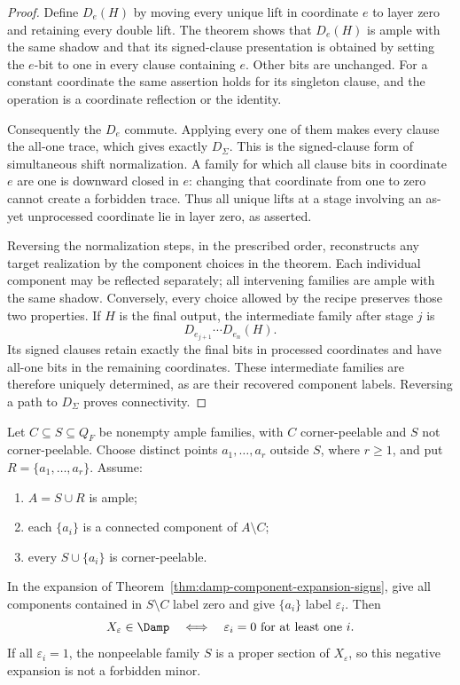 \begin{proof}
Define $D_e(H)$ by moving every unique lift in coordinate $e$ to layer
zero and retaining every double lift.  The theorem shows that $D_e(H)$
is ample with the same shadow and that its signed-clause presentation
is obtained by setting the $e$-bit to one in every clause containing $e$.
Other bits are unchanged.  For a constant coordinate the same assertion
holds for its singleton clause, and the operation is a coordinate
reflection or the identity.

Consequently the $D_e$ commute.  Applying every one of them makes every
clause the all-one trace, which gives exactly $D_\Sigma$.  This is the
signed-clause form of simultaneous shift normalization.  A family for
which all clause bits in coordinate $e$ are one is downward closed in
$e$: changing that coordinate from one to zero cannot create a forbidden
trace.  Thus all unique lifts at a stage involving an as-yet unprocessed
coordinate lie in layer zero, as asserted.

Reversing the normalization steps, in the prescribed order, reconstructs
any target realization by the component choices in the theorem.  Each
individual component may be reflected separately; all intervening families
are ample with the same shadow.  Conversely, every choice allowed by the
recipe preserves those two properties.  If $H$ is the final output,
the intermediate family after stage $j$ is
\[
 D_{e_{j+1}}\cdots D_{e_n}(H).
\]
Its signed clauses retain exactly the final bits in processed coordinates
and have all-one bits in the remaining coordinates.  These intermediate
families are therefore uniquely determined, as are their recovered
component labels.  Reversing a path to $D_\Sigma$ proves connectivity.
\end{proof}

\begin{proposition}
\label{prop:damp-component-label-repair-disjunction}
Let $C\subseteq S\subseteq Q_F$ be nonempty ample families, with $C$
corner-peelable and $S$ not corner-peelable.  Choose distinct points
$a_1,\ldots,a_r$ outside $S$, where $r\ge1$, and put
$R=\{a_1,\ldots,a_r\}$.  Assume:
\begin{enumerate}
 \item $A=S\cup R$ is ample;
 \item each $\{a_i\}$ is a connected component of $A\setminus C$;
 \item every $S\cup\{a_i\}$ is corner-peelable.
\end{enumerate}
In the expansion of Theorem~\ref{thm:damp-component-expansion-signs}, give
all components contained in $S\setminus C$ label zero and give
$\{a_i\}$ label $\varepsilon_i$.  Then
\[
 X_{\varepsilon}\in\Damp
 \quad\Longleftrightarrow\quad
 \varepsilon_i=0\text{ for at least one }i.
\]
If all $\varepsilon_i=1$, the nonpeelable family $S$ is a proper section
of $X_{\varepsilon}$, so this negative expansion is not a forbidden minor.
\end{proposition}

